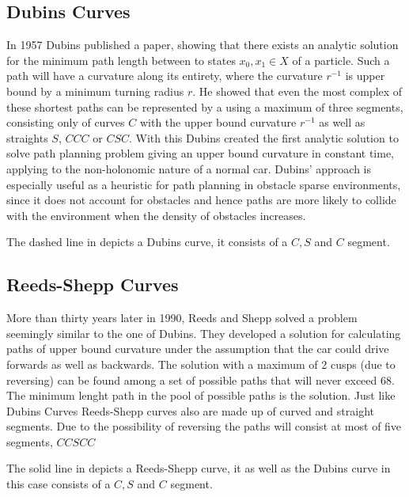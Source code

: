 \subsection{Dubins Curves}
In 1957 Dubins published a paper, showing that there exists an analytic solution for the minimum path length between to states $x_0, x_1 \in X$ of a particle. Such a path will have a curvature along its entirety, where the curvature $r^{-1}$ is upper bound by a minimum turning radius $r$. He showed that even the most complex of these shortest paths can be represented by a using a maximum of three segments, consisting only of curves $C$ with the upper bound curvature $r^{-1}$ as well as straights $S$, $CCC$ or $CSC$. \cite{Dubins.1957} With this Dubins created the first analytic solution to solve path planning problem giving an upper bound curvature in constant time, applying to the non-holonomic nature of a normal car. Dubins' approach is especially useful as a heuristic for path planning in obstacle sparse environments, since it does not account for obstacles and hence paths are more likely to collide with the environment when the density of obstacles increases. 

The dashed line in  depicts a Dubins curve, it consists of a $C,S$ and $C$ segment.

\subsection{Reeds-Shepp Curves}
More than thirty years later in 1990, Reeds and Shepp solved a problem seemingly similar to the one of Dubins. They developed a solution for calculating paths of upper bound curvature under the assumption that the car could drive forwards as well as backwards. The solution with a maximum of 2 cusps (due to reversing) can be found among a set of possible paths that will never exceed 68. The minimum lenght path in the pool of possible paths is the solution. Just like Dubins Curves Reeds-Shepp curves also are made up of curved and straight segments. Due to the possibility of reversing the paths will consist at most of five segments, $CCSCC$ \cite{Reeds.1990}

The solid line in  depicts a Reeds-Shepp curve, it as well as the Dubins curve in this case consists of a $C,S$ and $C$ segment.

